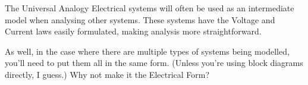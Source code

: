 \documentclass{../templates/topic}
\begin{document}
\begin{section}{The Universal Analogy}
	Electrical systems will often be used as an intermediate model when analysing other systems. These systems have the Voltage and Current laws easily formulated, making analysis more straightforward.
	
	As well, in the case where there are multiple types of systems being modelled, you'll need to put them all in the same form. (Unless you're using block diagrams directly, I guess.) Why not make it the Electrical Form?
		
\end{section}
\end{document}
